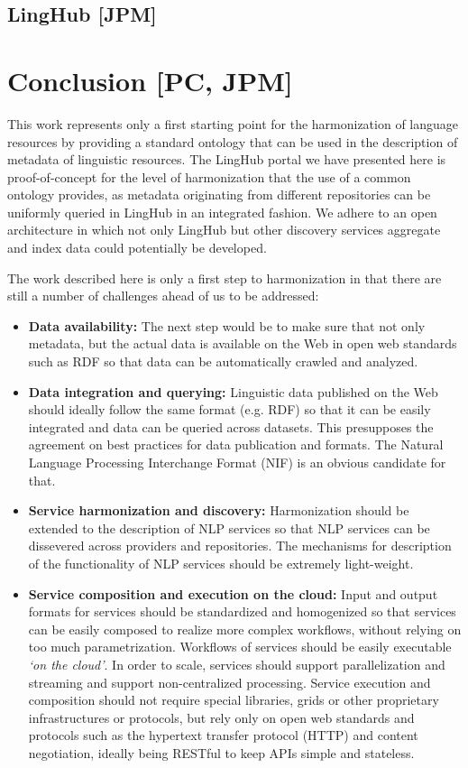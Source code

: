 \documentclass{llncs}
\begin{document}
{\subsection{LingHub [JPM]}

\section{Conclusion [PC, JPM]}
\label{sec:conclusion}

This work represents only a first starting point for the harmonization of language resources by providing a standard ontology that can be used in the description of metadata of linguistic resources. The LingHub portal we have presented here is proof-of-concept for the level of harmonization that the use of a common ontology provides, as metadata originating from different repositories can be uniformly queried in LingHub in an integrated fashion. We adhere to an open architecture in which not only LingHub but other discovery services aggregate and index data could potentially be developed. 

The work described here is only a first step to harmonization in that there are still a number of challenges ahead of us to be addressed:

\begin{itemize}
\item \textbf{Data availability:} The next step would be to make sure that not only metadata, but the actual data is available on the Web in open web standards such as RDF so that data can be automatically crawled and analyzed.
\item \textbf{Data integration and querying:} Linguistic data published on the
    Web should ideally follow the same format (e.g. RDF) so that it can be
    easily integrated and data can be queried across datasets. This presupposes
    the agreement on best practices for data publication and formats. The
    Natural Language Processing Interchange Format (NIF)\cite{hellmann2013integrating} is an obvious candidate for that.
\item \textbf{Service harmonization and discovery:} Harmonization should be extended to the description of NLP services so that NLP services can be dissevered across providers and repositories. The mechanisms for description of the functionality of NLP services should be extremely light-weight.
\item \textbf{Service composition and execution on the cloud:} Input and output formats for services should be standardized and homogenized so that services can be easily composed to realize more complex workflows, without relying on too much parametrization. Workflows of services should be easily executable \emph{`on the cloud'}. In order to scale, services should support parallelization and streaming and support non-centralized processing. Service execution and composition should not require special libraries, grids or other proprietary infrastructures or protocols, but rely only on open web standards and protocols such as the hypertext transfer protocol (HTTP) and content negotiation, ideally being RESTful to keep APIs simple and stateless.
\end{itemize}


}
\end{document}
